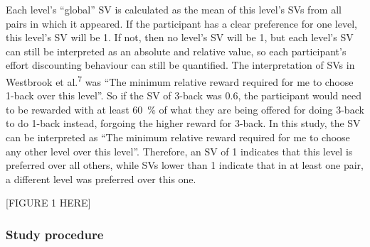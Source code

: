 \documentclass[
  man,floatsintext]{apa6}
\begin{document}
Each level's ``global'' SV is calculated as the mean of this level's SVs from all pairs in which it appeared.
If the participant has a clear preference for one level, this level's SV will be 1.
If not, then no level's SV will be 1, but each level's SV can still be interpreted as an absolute and relative value, so each participant's effort discounting behaviour can still be quantified.
The interpretation of SVs in Westbrook et al.\textsuperscript{7} was ``The minimum relative reward required for me to choose 1-back over this level''.
So if the SV of 3-back was 0.6, the participant would need to be rewarded with at least 60~\% of what they are being offered for doing 3-back to do 1-back instead, forgoing the higher reward for 3-back.
In this study, the SV can be interpreted as ``The minimum relative reward required for me to choose any other level over this level''.
Therefore, an SV of 1 indicates that this level is preferred over all others, while SVs lower than 1 indicate that in at least one pair, a different level was preferred over this one.

{[}FIGURE 1 HERE{]}

\hypertarget{study-procedure}{%
\subsubsection{Study procedure}\label{study-procedure}}
\end{document}
